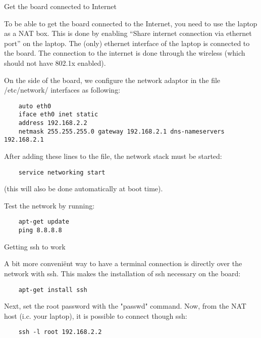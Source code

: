 \begin{myitemize}
\item{Get the board connected to Internet} 

To be able to get the board connected to the Internet, you need to use the laptop as a NAT box. This is done by enabling “Share internet connection via ethernet port” on the laptop. The (only) ethernet interface of the laptop is connected to the board. The connection to the internet is done through the wireless (which should not have 802.1x enabled).



On the side of the board, we configure the network adaptor in the file /etc/network/ interfaces as following:
    \begin{tcolorbox}
    \begin{verbatim}
    auto eth0
    iface eth0 inet static
    address 192.168.2.2
    netmask 255.255.255.0 gateway 192.168.2.1 dns-nameservers 192.168.2.1
    \end{verbatim}
    \end{tcolorbox}

After adding these lines to the file, the network stack must be started: 

\begin{tcolorbox}
    \begin{verbatim}
    service networking start
    \end{verbatim}
\end{tcolorbox}

(this will also be done automatically at boot time).


\item{Test the network by running:}


\begin{tcolorbox}
    \begin{verbatim}
    apt-get update
    ping 8.8.8.8
    \end{verbatim}
\end{tcolorbox}


\item{Getting ssh to work}

A bit more conveniënt way to have a terminal connection is directly over the network with ssh. This makes the installation of ssh necessary on the board:


\begin{tcolorbox}
    \begin{verbatim}
    apt-get install ssh
    \end{verbatim}
\end{tcolorbox}

Next, set the root password with the "passwd" command.
Now, from the NAT host (i.c. your laptop), it is possible to connect though ssh:


\begin{tcolorbox}
    \begin{verbatim}
    ssh -l root 192.168.2.2 
    \end{verbatim}
\end{tcolorbox}


\end{myitemize}

